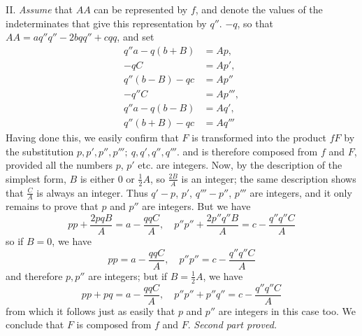 II. \textit{Assume} that \(AA\) can be represented by \(f\), and denote the values of the indeterminates that give this representation by \(q''\). \(-q\), so that \(AA=aq''q''-2bqq''+cqq\), and set
\[
\begin{aligned}
q''a-q(b+B)&=Ap,\\ -qC&=Ap',\\ q''(b-B)-qc&=Ap''\\ -q''C&=Ap''',\\ q''a-q(b-B)&=Aq',\\ q''(b+B)-qc&=Aq'''
\end{aligned}
\]
Having done this, we easily confirm that \(F\) is transformed into the product \(fF\) by the substitution \(p,\allowbreak p',\allowbreak p'',\allowbreak p''';\allowbreak \ q,\allowbreak q',\allowbreak q'',\allowbreak q'''\). and is therefore composed from \(f\) and \(F\), provided all the numbers \(p\), \(p'\) etc. are integers. Now, by the description of the simplest form, \(B\) is either \(0\) or \(\frac12 A\), so \(\frac{2B}{A}\) is an integer; the same description shows that \(\frac{C}{A}\) is always an integer. Thus \(q'-p\), \(p'\), \(q'''-p''\), \(p'''\) are integers, and it only remains to prove that \(p\) and \(p''\) are integers. But we have
\[
pp+\frac{2pqB}{A}=a-\frac{qqC}{A},\quad p''p''+\frac{2p''q''B}{A}=c-\frac{q''q''C}{A}
\]
so if \(B=0\), we have
\[
pp=a-\frac{qqC}{A},\quad p''p''=c-\frac{q''q''C}{A}
\]
and therefore \(p,p''\) are integers; but if \(B=\frac12 A\), we have
\[
pp+pq=a-\frac{qqC}{A},\quad p''p''+p''q''=c-\frac{q''q''C}{A}
\]
from which it follows just as easily that \(p\) and \(p''\) are integers in this case too. We conclude that \(F\) is composed from \(f\) and \(F\). \textit{Second part proved.}

